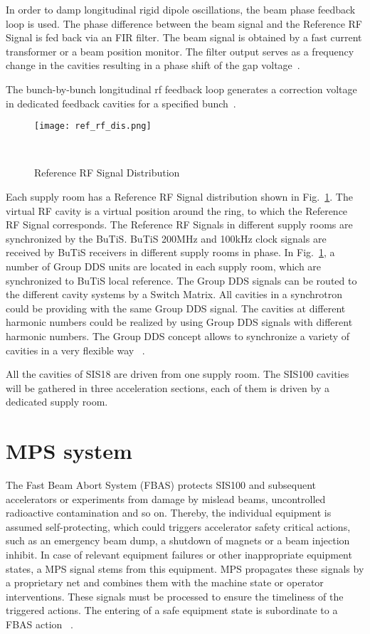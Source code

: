 In order to damp longitudinal rigid dipole oscillations, the beam phase feedback loop is used. The phase difference between the beam signal and the Reference RF Signal is fed back via an FIR filter. The beam signal is obtained by a fast current transformer or a beam position monitor. The filter output serves as a frequency change in the cavities resulting in a phase shift of the gap voltage~\cite{baudrenghien_low-level_2010}. 

The bunch-by-bunch longitudinal rf feedback loop generates a correction voltage in dedicated feedback cavities for a specified bunch~\cite{gross_bunch-by-bunch_2015}.


\begin{figure}[H]
   \centering   
   \texttt{[image: ref\_rf\_dis.png]}
   \caption{Reference RF Signal Distribution}{~\cite{klingbeil_new_2011}}
   \label{ref_rf_dis}
\end{figure}
Each supply room has a Reference RF Signal distribution shown in Fig.~\ref{ref_rf_dis}. The virtual RF cavity is a virtual position around the ring, to which the Reference RF Signal corresponds. The Reference RF Signals in different supply rooms are synchronized by the BuTiS. BuTiS 200MHz and 100kHz clock signals are received by BuTiS receivers in different supply rooms in phase. In Fig.~\ref{ref_rf_dis}, a number of Group DDS units are located in each supply room, which are synchronized to BuTiS local reference. The Group DDS signals can be routed to the different cavity systems by a Switch Matrix. All cavities in a synchrotron could be providing with the same Group DDS signal. The cavities at different harmonic numbers could be realized by using Group DDS signals with different harmonic numbers. The Group DDS concept allows to synchronize a variety of cavities in a very flexible way ~\cite{klingbeil_new_2011}. 

All the cavities of SIS18 are driven from one supply room. The SIS100 cavities will be gathered in three acceleration sections, each of them is driven by a dedicated supply room. 

\section{\gls{MPS} system}
The Fast Beam Abort System (\gls{FBAS}) protects SIS100 and subsequent accelerators or experiments from damage by mislead beams, uncontrolled radioactive contamination and so on. Thereby, the individual equipment is assumed self-protecting, which could triggers accelerator safety critical actions, such as an emergency beam dump, a shutdown of magnets or a beam injection inhibit. In case of relevant equipment failures or other inappropriate equipment states, a MPS signal stems from this equipment. MPS propagates these signals by a proprietary net and combines them with the machine state or operator interventions. These signals must be processed to ensure the timeliness of the triggered actions. The entering of a safe equipment state is subordinate to a FBAS action ~\cite{mandakovic_fair_????}.


